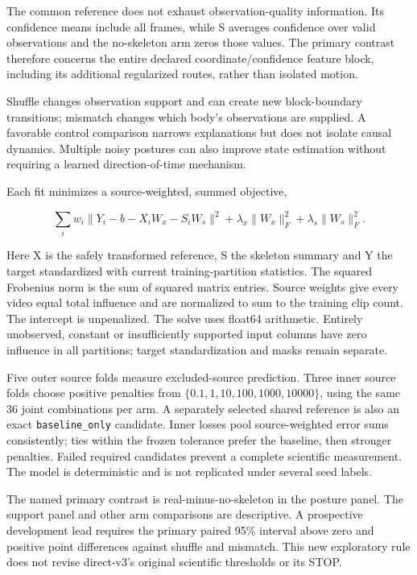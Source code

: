 \documentclass{article}
\begin{document}
The common reference does not exhaust observation-quality information. Its confidence means include all frames, while S averages confidence over valid observations and the no-skeleton arm zeros those values. The primary contrast therefore concerns the entire declared coordinate/confidence feature block, including its additional regularized routes, rather than isolated motion.

Shuffle changes observation support and can create new block-boundary transitions; mismatch changes which body's observations are supplied. A favorable control comparison narrows explanations but does not isolate causal dynamics. Multiple noisy postures can also improve state estimation without requiring a learned direction-of-time mechanism.

Each fit minimizes a source-weighted, summed objective,

\[
\sum_i w_i\|Y_i-b-X_iW_x-S_iW_s\|^2
+\lambda_x\|W_x\|_F^2+\lambda_s\|W_s\|_F^2.
\]

Here X is the safely transformed reference, S the skeleton summary and Y the target standardized with current training-partition statistics. The squared Frobenius norm is the sum of squared matrix entries. Source weights give every video equal total influence and are normalized to sum to the training clip count. The intercept is unpenalized. The solve uses float64 arithmetic. Entirely unobserved, constant or insufficiently supported input columns have zero influence in all partitions; target standardization and masks remain separate.

Five outer source folds measure excluded-source prediction. Three inner source folds choose positive penalties from \(\{0.1,1,10,100,1000,10000\}\), using the same 36 joint combinations per arm. A separately selected shared reference is also an exact \texttt{baseline\_only} candidate. Inner losses pool source-weighted error sums consistently; ties within the frozen tolerance prefer the baseline, then stronger penalties. Failed required candidates prevent a complete scientific measurement. The model is deterministic and is not replicated under several seed labels.

The named primary contrast is real-minus-no-skeleton in the posture panel. The support panel and other arm comparisons are descriptive. A prospective development lead requires the primary paired 95\% interval above zero and positive point differences against shuffle and mismatch. This new exploratory rule does not revise direct-v3's original scientific thresholds or its STOP.
\end{document}

